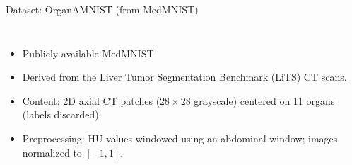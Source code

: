 \documentclass[10pt]{beamer}
\begin{document}
\begin{frame}{Dataset: OrganAMNIST (from MedMNIST)}
  \begin{columns}[T,onlytextwidth]
      \begin{itemize}\setlength\itemsep{0.8em}
        \item Publicly available MedMNIST~\cite{yang2023medmnist}
        \item Derived from the Liver Tumor Segmentation Benchmark (LiTS) CT scans.
        \item Content: 2D axial CT patches ($28\times28$ grayscale) centered on 11 organs (labels discarded).
        \item Preprocessing: HU values windowed using an abdominal window; images normalized to $[-1,1]$.
      \end{itemize}


\end{columns}
\end{frame}
\end{document}

